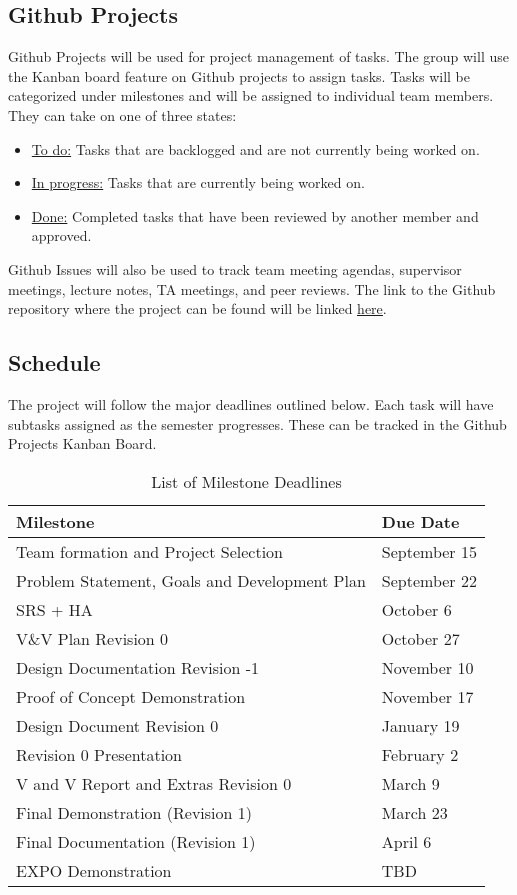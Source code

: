 \documentclass{article}
\begin{document}
\subsection{Github Projects}
Github Projects will be used for project management of tasks. The group will use the Kanban board feature on Github projects to assign tasks. Tasks will be categorized under milestones and will be assigned to individual team members. They can take on one of three states: 
\begin{itemize}
  \item \underline{To do:} Tasks that are backlogged and are not currently being worked on. 
  \item \underline{In progress:} Tasks that are currently being worked on.
  \item \underline{Done:} Completed tasks that have been reviewed by another member and approved.
\end{itemize}

\noindent Github Issues will also be used to track team meeting agendas, supervisor meetings, lecture notes, TA meetings, and peer reviews. The link to the Github repository where the project can be found will be linked \underline{\href{https://github.com/rosachen3/Cowgnition/tree/main}{here}}.

\subsection{Schedule}
The project will follow the major deadlines outlined below. Each task will have subtasks assigned as the semester progresses. These can be tracked in the Github Projects Kanban Board.

\begin{table}[H]

\centering
\caption{List of Milestone Deadlines}
\begin{tabularx}{\textwidth}{|l|X|}
\hline
\textbf{Milestone} & \textbf{Due Date} \\
\hline
Team formation and Project Selection & September 15 \\
\hline
Problem Statement, Goals and Development Plan & September 22 \\
\hline
SRS + HA & October 6 \\
\hline
V\&V Plan Revision 0 & October 27 \\
\hline
Design Documentation Revision -1 & November 10 \\
\hline
Proof of Concept Demonstration & November 17 \\
\hline
Design Document Revision 0 & January 19 \\
\hline
Revision 0 Presentation & February 2 \\
\hline
V and V Report and Extras Revision 0 & March 9 \\
\hline
Final Demonstration (Revision 1) & March 23 \\
\hline
Final Documentation (Revision 1) & April 6 \\
\hline
EXPO Demonstration & TBD \\
\hline
\end{tabularx}
\end{table}
\end{document}
